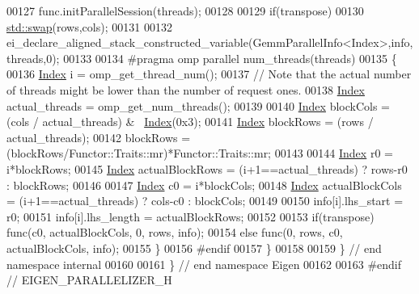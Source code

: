 \begin{DoxyCode}
00127   func.initParallelSession(threads);
00128 
00129   \textcolor{keywordflow}{if}(transpose)
00130     \hyperlink{endian_8c_a3ca5ecd34b04d6a243c054ac3a57f68d}{std::swap}(rows,cols);
00131 
00132   ei\_declare\_aligned\_stack\_constructed\_variable(GemmParallelInfo<Index>,info,threads,0);
00133 
00134 \textcolor{preprocessor}{  #pragma omp parallel num\_threads(threads)}
00135   \{
00136     \hyperlink{namespace_eigen_a62e77e0933482dafde8fe197d9a2cfde}{Index} i = omp\_get\_thread\_num();
00137     \textcolor{comment}{// Note that the actual number of threads might be lower than the number of request ones.}
00138     \hyperlink{namespace_eigen_a62e77e0933482dafde8fe197d9a2cfde}{Index} actual\_threads = omp\_get\_num\_threads();
00139 
00140     \hyperlink{namespace_eigen_a62e77e0933482dafde8fe197d9a2cfde}{Index} blockCols = (cols / actual\_threads) & ~\hyperlink{namespace_eigen_a62e77e0933482dafde8fe197d9a2cfde}{Index}(0x3);
00141     \hyperlink{namespace_eigen_a62e77e0933482dafde8fe197d9a2cfde}{Index} blockRows = (rows / actual\_threads);
00142     blockRows = (blockRows/Functor::Traits::mr)*Functor::Traits::mr;
00143 
00144     \hyperlink{namespace_eigen_a62e77e0933482dafde8fe197d9a2cfde}{Index} r0 = i*blockRows;
00145     \hyperlink{namespace_eigen_a62e77e0933482dafde8fe197d9a2cfde}{Index} actualBlockRows = (i+1==actual\_threads) ? rows-r0 : blockRows;
00146 
00147     \hyperlink{namespace_eigen_a62e77e0933482dafde8fe197d9a2cfde}{Index} c0 = i*blockCols;
00148     \hyperlink{namespace_eigen_a62e77e0933482dafde8fe197d9a2cfde}{Index} actualBlockCols = (i+1==actual\_threads) ? cols-c0 : blockCols;
00149 
00150     info[i].lhs\_start = r0;
00151     info[i].lhs\_length = actualBlockRows;
00152 
00153     \textcolor{keywordflow}{if}(transpose) func(c0, actualBlockCols, 0, rows, info);
00154     \textcolor{keywordflow}{else}          func(0, rows, c0, actualBlockCols, info);
00155   \}
00156 \textcolor{preprocessor}{#endif}
00157 \}
00158 
00159 \} \textcolor{comment}{// end namespace internal}
00160 
00161 \} \textcolor{comment}{// end namespace Eigen}
00162 
00163 \textcolor{preprocessor}{#endif // EIGEN\_PARALLELIZER\_H}
\end{DoxyCode}
